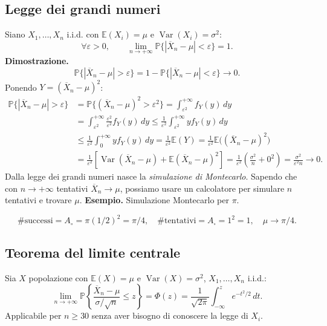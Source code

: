 \subsection*{Legge dei grandi numeri}
Siano $X_1,\ldots,X_n$ i.i.d. con $\mathbb E(X_i)=\mu$ e $\operatorname{Var}(X_i)=\sigma^2$:
\[\forall\varepsilon>0,\qquad\lim_{n\to+\infty}\mathbb P\{|\overline X_n-\mu|<\varepsilon\}=1.\]
\textbf{Dimostrazione.}
\[\mathbb P\{|\overline X_n-\mu|>\varepsilon\}=1-\mathbb P\{|\overline X_n-\mu|<\varepsilon\}\longrightarrow0.\]
Ponendo $Y=(\overline X_n-\mu)^2$:
\begin{align*}
\mathbb P\{|\overline X_n-\mu|>\varepsilon\}&=\mathbb P\{(\overline X_n-\mu)^2>\varepsilon^2\}
=\int_{\varepsilon^2}^{+\infty}f_Y(y)\,dy\\
&=\int_{\varepsilon^2}^{+\infty}\frac{\varepsilon^2}{\varepsilon^2}f_Y(y)\,dy
\le\frac1{\varepsilon^2}\int_{\varepsilon^2}^{+\infty}y f_Y(y)\,dy\\
&\le\frac1{\varepsilon^2}\int_0^{+\infty}y f_Y(y)\,dy
=\frac1{\varepsilon^2}\mathbb E(Y)=\frac1{\varepsilon^2}\mathbb E\bigl((\overline X_n-\mu)^2\bigr)\\
&=\frac1{\varepsilon^2}\left[\operatorname{Var}(\overline X_n-\mu)+\mathbb E(\overline X_n-\mu)^2\right]
=\frac1{\varepsilon^2}\left(\frac{\sigma^2}{n}+0^2\right)=\frac{\sigma^2}{\varepsilon^2 n}\longrightarrow0.
\end{align*}
Dalla legge dei grandi numeri nasce la \emph{simulazione di Montecarlo}.
Sapendo che con $n\to+\infty$ tentativi $\overline X_n\to\mu$, possiamo usare un calcolatore per simulare $n$ tentativi e trovare $\mu$.
\textbf{Esempio.} Simulazione Montecarlo per $\pi$.
\begin{center}\end{center}
\[\#\text{successi}=A_{\circ}=\pi(1/2)^2=\pi/4,\quad\#\text{tentativi}=A_{\square}=1^2=1,\quad\mu\to\pi/4.\]
\subsection*{Teorema del limite centrale}
Sia $X$ popolazione con $\mathbb E(X)=\mu$ e $\operatorname{Var}(X)=\sigma^2$, $X_1,\ldots,X_n$ i.i.d.:
\[\lim_{n\to+\infty}\mathbb P\left\{\frac{\overline X_n-\mu}{\sigma/\sqrt n}\le z\right\}=\Phi(z)=\frac1{\sqrt{2\pi}}\int_{-\infty}^z e^{-t^2/2}\,dt.\]
Applicabile per $n\ge30$ senza aver bisogno di conoscere la legge di $X_i$.
